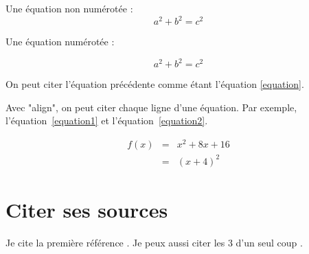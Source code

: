 \documentclass[12pt]{article}
\begin{document}
Une équation non numérotée :
$$a^2 + b^2 = c^2$$

Une équation numérotée :

\begin{equation}
a^2 + b^2 = c^2
\label{equation}
\end{equation}

On peut citer l'équation précédente comme étant l'équation \ref{equation}.

Avec "align", on peut citer chaque ligne d'une équation. Par exemple, l'équation~\ref{equation1} et l'équation~\ref{equation2}.

\begin{align}
   f(x) & = & x^2 + 8x + 16 \label{equation1}\\  
   & = & (x+4)^2 \label{equation2}
\end{align}


\section{Citer ses sources}

Je cite la première référence \cite{ref1}. Je peux aussi citer les 3 d'un seul coup \cite{ref1,ref2,ref3}.





%
\end{document}
